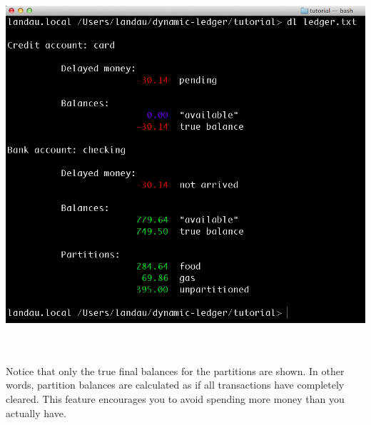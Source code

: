 \documentclass{article}
\providecommand{\q}{$\quad$ \newline}
\begin{document}
\begin{flushleft}
\begin{center}
\includegraphics[scale=.45]{fig/sum8.png}
\end{center} \q

\paragraph{} Notice that only the true final balances for the partitions are shown. In other words, partition balances are calculated as if all transactions have completely cleared. This feature encourages you to avoid spending more money than you actually have.

\end{flushleft}
% 
%
\end{document}
